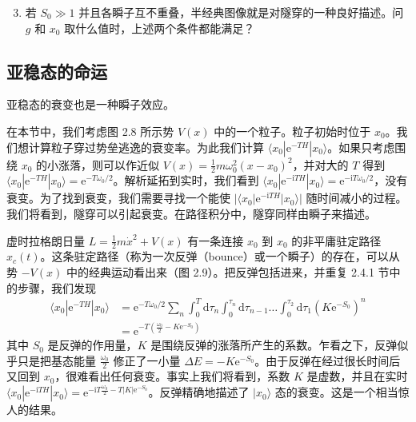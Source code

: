 \begin{enumerate}
\setcounter{enumi}{2}
\item 若 $S_0 \gg 1$ 并且各瞬子互不重叠，半经典图像就是对隧穿的一种良好描述。问 $g$ 和 $x_0$ 取什么值时，上述两个条件都能满足？
\end{enumerate}

\subsection{亚稳态的命运}

\begin{keypoints}
\item 亚稳态的衰变也是一种瞬子效应。
\end{keypoints}

在本节中，我们考虑图 2.8 所示势 $V(x)$ 中的一个粒子。粒子初始时位于 $x_0$。我们想计算粒子穿过势垒逃逸的衰变率。为此我们计算 $\langle x_0|\mathrm{e}^{-TH}|x_0\rangle$。如果只考虑围绕 $x_0$ 的小涨落，则可以作近似 $V(x) = \frac{1}{2}m\omega_0^2(x - x_0)^2$，并对大的 $T$ 得到 $\langle x_0|\mathrm{e}^{-TH}|x_0\rangle = \mathrm{e}^{-T\omega_0/2}$。解析延拓到实时，我们看到 $\langle x_0|\mathrm{e}^{-\mathrm{i}TH}|x_0\rangle = \mathrm{e}^{-\mathrm{i}T\omega_0/2}$，没有衰变。为了找到衰变，我们需要寻找一个能使 $|\langle x_0|\mathrm{e}^{-\mathrm{i}TH}|x_0\rangle|$ 随时间减小的过程。我们将看到，隧穿可以引起衰变。在路径积分中，隧穿同样由瞬子来描述。

虚时拉格朗日量 $L = \frac{1}{2}m\dot{x}^2 + V(x)$ 有一条连接 $x_0$ 到 $x_0$ 的非平庸驻定路径 $x_c(t)$。这条驻定路径（称为一次反弹（bounce）或一个瞬子）的存在，可以从势 $-V(x)$ 中的经典运动看出来（图 2.9）。把反弹包括进来，并重复 2.4.1 节中的步骤，我们发现
\begin{align*}
\langle x_0|\mathrm{e}^{-TH}|x_0\rangle &= \mathrm{e}^{-T\omega_0/2} \sum_n \int_0^T \mathrm{d}\tau_n \int_0^{\tau_n} \mathrm{d}\tau_{n-1} \dots \int_0^{\tau_2} \mathrm{d}\tau_1 \left(K\mathrm{e}^{-S_0}\right)^n \\
&= \mathrm{e}^{-T(\frac{\omega_0}{2} - K\mathrm{e}^{-S_0})}\tag{2.4.1}
\end{align*}
其中 $S_0$ 是反弹的作用量，$K$ 是围绕反弹的涨落所产生的系数。乍看之下，反弹似乎只是把基态能量 $\frac{\omega_0}{2}$ 修正了一小量 $\Delta E = -K\mathrm{e}^{-S_0}$。由于反弹在经过很长时间后又回到 $x_0$，很难看出任何衰变。事实上我们将看到，系数 $K$ 是虚数，并且在实时 $\langle x_0|\mathrm{e}^{-\mathrm{i}TH}|x_0\rangle = \mathrm{e}^{-\mathrm{i}T\frac{\omega_0}{2} - T|K|\mathrm{e}^{-S_0}}$。反弹精确地描述了 $|x_0\rangle$ 态的衰变。这是一个相当惊人的结果。

